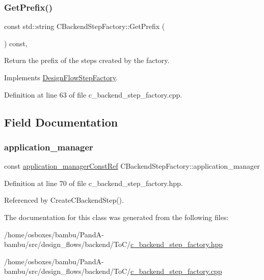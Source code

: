 \subsubsection{\texorpdfstring{Get\+Prefix()}{GetPrefix()}}
{\footnotesize\ttfamily const std\+::string C\+Backend\+Step\+Factory\+::\+Get\+Prefix (\begin{DoxyParamCaption}{ }\end{DoxyParamCaption}) const\hspace{0.3cm}{\ttfamily [override]}, {\ttfamily [virtual]}}



Return the prefix of the steps created by the factory. 



Implements \hyperlink{classDesignFlowStepFactory_a52abfc00c170b5a63e84431b75eb698e}{Design\+Flow\+Step\+Factory}.



Definition at line 63 of file c\+\_\+backend\+\_\+step\+\_\+factory.\+cpp.



\subsection{Field Documentation}
\mbox{\label{classCBackendStepFactory_af7941e69d2f938036744cecacd6ae537}} 
\subsubsection{\texorpdfstring{application\+\_\+manager}{application\_manager}}
{\footnotesize\ttfamily const \hyperlink{application__manager_8hpp_abb985163a2a3fb747f6f03b1eaadbb44}{application\+\_\+manager\+Const\+Ref} C\+Backend\+Step\+Factory\+::application\+\_\+manager\hspace{0.3cm}{\ttfamily [private]}}



Definition at line 70 of file c\+\_\+backend\+\_\+step\+\_\+factory.\+hpp.



Referenced by Create\+C\+Backend\+Step().



The documentation for this class was generated from the following files\+:\begin{DoxyCompactItemize}
\item 
/home/osboxes/bambu/\+Pand\+A-\/bambu/src/design\+\_\+flows/backend/\+To\+C/\hyperlink{c__backend__step__factory_8hpp}{c\+\_\+backend\+\_\+step\+\_\+factory.\+hpp}\item 
/home/osboxes/bambu/\+Pand\+A-\/bambu/src/design\+\_\+flows/backend/\+To\+C/\hyperlink{c__backend__step__factory_8cpp}{c\+\_\+backend\+\_\+step\+\_\+factory.\+cpp}\end{DoxyCompactItemize}
